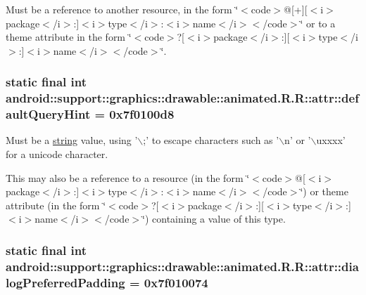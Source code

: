 Must be a reference to another resource, in the form \char`\"{}$<$code$>$@\mbox{[}+\mbox{]}\mbox{[}$<$i$>$package$<$/i$>$:\mbox{]}$<$i$>$type$<$/i$>$:$<$i$>$name$<$/i$>$$<$/code$>$\char`\"{} or to a theme attribute in the form \char`\"{}$<$code$>$?\mbox{[}$<$i$>$package$<$/i$>$:\mbox{]}\mbox{[}$<$i$>$type$<$/i$>$:\mbox{]}$<$i$>$name$<$/i$>$$<$/code$>$\char`\"{}. \hypertarget{classandroid_1_1support_1_1graphics_1_1drawable_1_1animated_1_1_r_1_1attr_ce863b1d025d537ef86ec2268260cb3a}{
\subsubsection[{defaultQueryHint}]{\setlength{\rightskip}{0pt plus 5cm}static final int android::support::graphics::drawable::animated.R.R::attr::defaultQueryHint = 0x7f0100d8}}
\label{classandroid_1_1support_1_1graphics_1_1drawable_1_1animated_1_1_r_1_1attr_ce863b1d025d537ef86ec2268260cb3a}


Must be a \hyperlink{classandroid_1_1support_1_1graphics_1_1drawable_1_1animated_1_1_r_1_1string}{string} value, using '$\backslash$;' to escape characters such as '$\backslash$n' or '$\backslash$uxxxx' for a unicode character. 

This may also be a reference to a resource (in the form \char`\"{}$<$code$>$@\mbox{[}$<$i$>$package$<$/i$>$:\mbox{]}$<$i$>$type$<$/i$>$:$<$i$>$name$<$/i$>$$<$/code$>$\char`\"{}) or theme attribute (in the form \char`\"{}$<$code$>$?\mbox{[}$<$i$>$package$<$/i$>$:\mbox{]}\mbox{[}$<$i$>$type$<$/i$>$:\mbox{]}$<$i$>$name$<$/i$>$$<$/code$>$\char`\"{}) containing a value of this type. \hypertarget{classandroid_1_1support_1_1graphics_1_1drawable_1_1animated_1_1_r_1_1attr_5893f9b48cd41c4dadf963810260f8d7}{
\subsubsection[{dialogPreferredPadding}]{\setlength{\rightskip}{0pt plus 5cm}static final int android::support::graphics::drawable::animated.R.R::attr::dialogPreferredPadding = 0x7f010074}}
\label{classandroid_1_1support_1_1graphics_1_1drawable_1_1animated_1_1_r_1_1attr_5893f9b48cd41c4dadf963810260f8d7}


